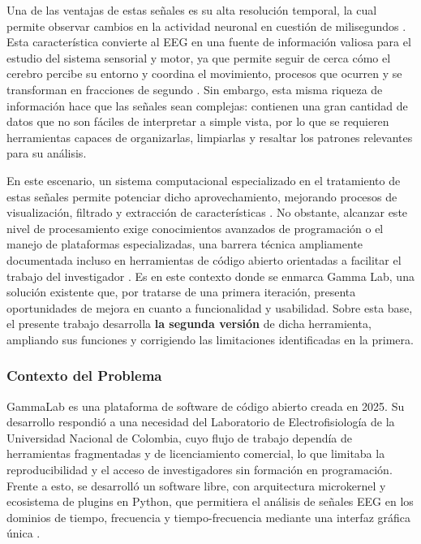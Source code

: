 \documentclass[12pt,letterpaper,oneside]{article}
\begin{document}
Una de las ventajas de estas señales es su alta resolución temporal, la cual permite observar cambios en la actividad neuronal en cuestión de milisegundos \cite{walla2025}. Esta característica convierte al EEG en una fuente de información valiosa para el estudio del sistema sensorial y motor, ya que permite seguir de cerca cómo el cerebro percibe su entorno y coordina el movimiento, procesos que ocurren y se transforman en fracciones de segundo \cite{srinivasan2025}. Sin embargo, esta misma riqueza de información hace que las señales sean complejas: contienen una gran cantidad de datos que no son fáciles de interpretar a simple vista, por lo que se requieren herramientas capaces de organizarlas, limpiarlas y resaltar los patrones relevantes para su análisis.

En este escenario, un sistema computacional especializado en el tratamiento de estas señales permite potenciar dicho aprovechamiento, mejorando procesos de visualización, filtrado y extracción de características \cite{chaddad2023}. No obstante, alcanzar este nivel de procesamiento exige conocimientos avanzados de programación o el manejo de plataformas especializadas, una barrera técnica ampliamente documentada incluso en herramientas de código abierto orientadas a facilitar el trabajo del investigador \cite{vanes2025}. Es en este contexto donde se enmarca Gamma Lab, una solución existente que, por tratarse de una primera iteración, presenta oportunidades de mejora en cuanto a funcionalidad y usabilidad. Sobre esta base, el presente trabajo desarrolla \textbf{la segunda versión} de dicha herramienta, ampliando sus funciones y corrigiendo las limitaciones identificadas en la primera.

\subsubsection{Contexto del Problema}
GammaLab es una plataforma de software de código abierto creada en 2025. Su desarrollo respondió a una necesidad del Laboratorio de Electrofisiología de la Universidad Nacional de Colombia, cuyo flujo de trabajo dependía de herramientas fragmentadas y de licenciamiento comercial, lo que limitaba la reproducibilidad y el acceso de investigadores sin formación en programación. Frente a esto, se desarrolló un software libre, con arquitectura microkernel y ecosistema de plugins en Python, que permitiera el análisis de señales EEG en los dominios de tiempo, frecuencia y tiempo-frecuencia mediante una interfaz gráfica única \cite{asencio2025}.
\end{document}
